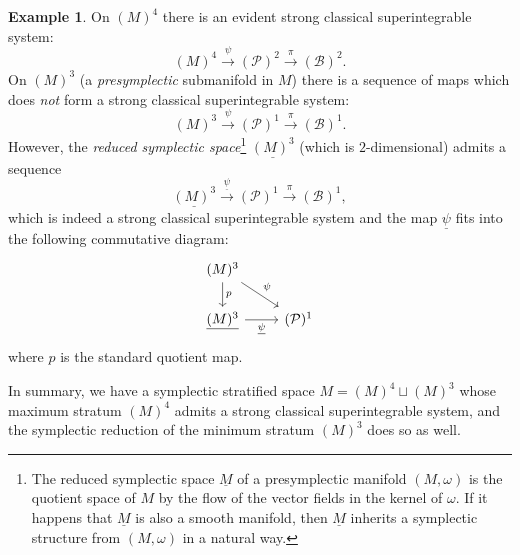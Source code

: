 \documentclass[12pt]{amsart}
\theoremstyle{definition}
\newtheorem{example}[theorem]{Example}
\numberwithin{equation}{section}
\begin{document}
\begin{example}
      
On $(M)^4$ there is an evident strong classical superintegrable system:
\begin{equation} \label{Seq:ExampleToySequenceR4max} (M)^4  \overset{\psi}{\longrightarrow} (\mathcal{P})^2   \overset{\pi}{\longrightarrow} (\mathcal{B})^2  .
  \end{equation}
On $(M)^3 $    (a \emph{presymplectic} submanifold in $M $) there is a sequence of maps which does \emph{not} form     a strong classical superintegrable system:
\begin{equation} \label{Seq:ExampleToySequenceR4min} (M)^3   \overset{\psi}{\longrightarrow} (\mathcal{P})^1    \overset{\pi}{\longrightarrow} (\mathcal{B})^1    .
  \end{equation}
  However, the   \emph{reduced symplectic space}\footnote{The reduced symplectic space $\underline{M}$ of a presymplectic manifold $(M,\omega)$ is the quotient space of $M$   by the flow of the vector fields in the kernel of $\omega$. If it happens that $\underline{M}$ is also a smooth manifold, then $\underline{M}$ inherits a   symplectic structure from $(M,\omega)$ in a natural way.} $\underline{(M)^3}    $ (which is $2$-dimensional)  admits a sequence 
  \begin{equation} \label{Seq:ExampleToySequenceR4minreduced} \underline{(M)^3}      \overset{\underline{\psi}}{\longrightarrow} (\mathcal{P})^1    \overset{\pi}{\longrightarrow} (\mathcal{B})^1 ,   
  \end{equation}
  which is indeed a strong classical superintegrable system and the map $\underline{\psi}$ fits into the following commutative diagram: 
     \begin{equation} \nonumber     \begin{tikzcd}
 	 (M)^3 \arrow[dr,"\psi "] \arrow[d,"p"] & ~   \\
 	\underline{(M)^3}   \arrow[r,"\underline{\psi} "']     & (\mathcal{P})^1      
 \end{tikzcd}
\end{equation}
where $p$ is the standard quotient map.

In summary, we have a  symplectic stratified space $M =(M)^4\sqcup (M)^3$   whose maximum stratum $(M)^4$ admits a strong classical superintegrable system, and the symplectic reduction of the minimum stratum $(M)^3$ does so as well.
  \end{example}
  
\end{document}

